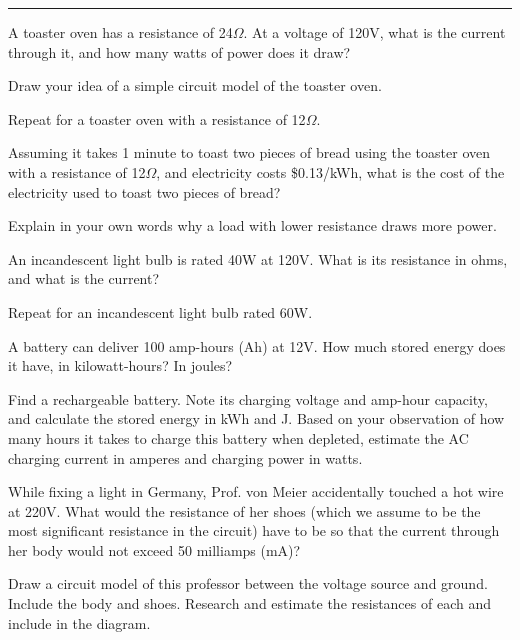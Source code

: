 \documentclass{article}
\begin{document}
\hrule
\vspace{10pt}




\subproblem
A toaster oven has a resistance of 24$\Omega$.  At a voltage of 120V,
what is the current through it, and how many watts of power does it
draw?

\subproblem
Draw your idea of a simple circuit model of the toaster oven.

\subproblem
Repeat for a toaster oven with a resistance of 12$\Omega$.

\subproblem
Assuming it takes 1 minute to toast two pieces of bread using the
toaster oven with a resistance of 12$\Omega$, and electricity costs
\$0.13/kWh, what is the cost of the electricity used to toast two
pieces of bread?

\subproblem
Explain in your own words why a load with lower resistance draws
more power.




\subproblem
An incandescent light bulb is rated 40W at 120V.  What is its
resistance in ohms, and what is the current?

\subproblem
Repeat for an incandescent light bulb rated 60W.



\subproblem
A battery can deliver 100 amp-hours (Ah) at 12V.  How much stored
energy does it have, in kilowatt-hours?  In joules?

\subproblem
Find a rechargeable battery. Note its charging voltage and
amp-hour capacity, and calculate the stored energy in kWh and J.
Based on your observation of how many hours it takes to charge this
battery when depleted, estimate the AC charging current in amperes and
charging power in watts.


\subproblem
While fixing a light in Germany, Prof. von Meier accidentally
touched a hot wire at 220V.  What would the resistance of her shoes
(which we assume to be the most significant resistance in the
circuit) have to be so that the current through her body would not
exceed 50 milliamps (mA)?

\subproblem
Draw a circuit model of this professor between the voltage source and
ground.  Include the body and shoes.  Research and estimate the
resistances of each and include in the diagram.
\end{document}
